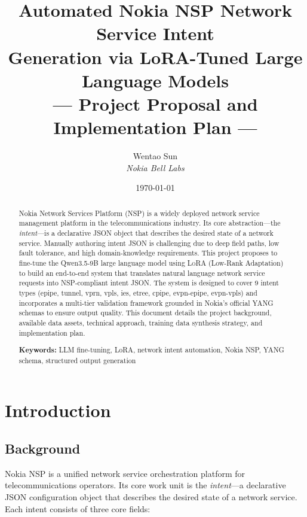 \documentclass[12pt, a4paper]{article}
\title{%
  \vspace{-1cm}
  {\LARGE\bfseries Automated Nokia NSP Network Service Intent\\[4pt]
  Generation via LoRA-Tuned Large Language Models}\\[12pt]
  {\large --- Project Proposal and Implementation Plan ---}
}
\author{%
  Wentao Sun \\[3pt]
  {\small\textit{Nokia Bell Labs}}
}
\date{\today}
\newcommand{\yang}{\textsc{YANG}}
\newcommand{\nsp}{\textsc{NSP}}
\newcommand{\lora}{\textsc{LoRA}}
\begin{document}
\maketitle
\thispagestyle{empty}

\begin{abstract}
\noindent
Nokia Network Services Platform (\nsp{}) is a widely deployed network service management platform in the telecommunications industry. Its core abstraction---the \emph{intent}---is a declarative JSON object that describes the desired state of a network service. Manually authoring intent JSON is challenging due to deep field paths, low fault tolerance, and high domain-knowledge requirements. This project proposes to fine-tune the Qwen3.5-9B large language model using \lora{} (Low-Rank Adaptation) to build an end-to-end system that translates natural language network service requests into \nsp{}-compliant intent JSON. The system is designed to cover 9 intent types (epipe, tunnel, vprn, vpls, ies, etree, cpipe, evpn-epipe, evpn-vpls) and incorporates a multi-tier validation framework grounded in Nokia's official \yang{} schemas to ensure output quality. This document details the project background, available data assets, technical approach, training data synthesis strategy, and implementation plan.

\vspace{6pt}
\noindent\textbf{Keywords:} LLM fine-tuning, LoRA, network intent automation, Nokia NSP, YANG schema, structured output generation
\end{abstract}

\newpage
\tableofcontents
\newpage

\section{Introduction}

\subsection{Background}

Nokia \nsp{} is a unified network service orchestration platform for telecommunications operators. Its core work unit is the \emph{intent}---a declarative JSON configuration object that describes the desired state of a network service. Each intent consists of three core fields:
\end{document}
